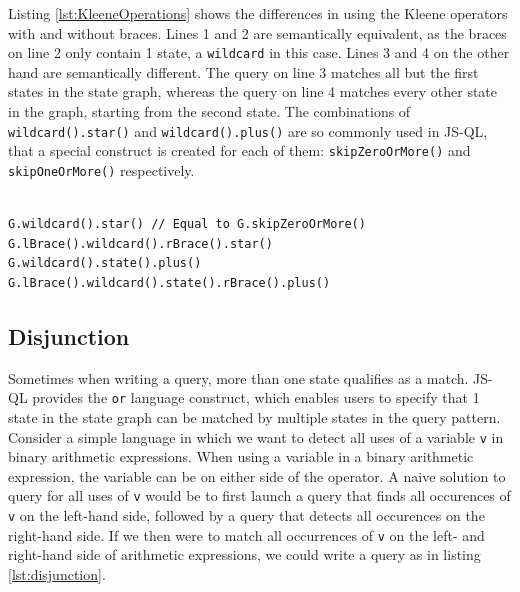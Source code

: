 \begin{exmp}
\label{ex:Kleene}
 Listing \ref{lst:KleeneOperations} shows the differences in using the Kleene operators with and without braces. Lines 1 and 2 are semantically equivalent, as the braces on line 2 only contain 1 state, a \texttt{wildcard} in this case. Lines 3 and 4 on the other hand are semantically different. The query on line 3 matches all but the first states in the state graph, whereas the query on line 4 matches every other state in the graph, starting from the second state. The combinations of \texttt{wildcard().star()} and \texttt{wildcard().plus()} are so commonly used in JS-QL, that a special construct is created for each of them: \texttt{skipZeroOrMore()} and \texttt{skipOneOrMore()} respectively.

\begin{lstlisting}[label={lst:KleeneOperations},language=JSQL,caption=Kleene operations differences,mathescape=true]  % float=t?

G.wildcard().star() // Equal to G.skipZeroOrMore()
G.lBrace().wildcard().rBrace().star()
G.wildcard().state().plus()
G.lBrace().wildcard().state().rBrace().plus()
\end{lstlisting}
\end{exmp}

\subsection{Disjunction}

Sometimes when writing a query, more than one state qualifies as a match. JS-QL provides the \texttt{or} language construct, which enables users to specify that 1 state in the state graph can be matched by multiple states in the query pattern. Consider a simple language in which we want to detect all uses of a variable \texttt{v} in binary arithmetic expressions. When using a variable in a binary arithmetic expression, the variable can be on either side of the operator. A naive solution to query for all uses of \texttt{v} would be to first launch a query that finds all occurences of \texttt{v} on the left-hand side, followed by a query that detects all occurences on the right-hand side. If we then were to match all occurrences of \texttt{v} on the left- and right-hand side of arithmetic expressions, we could write a query as in listing \ref{lst:disjunction}.

